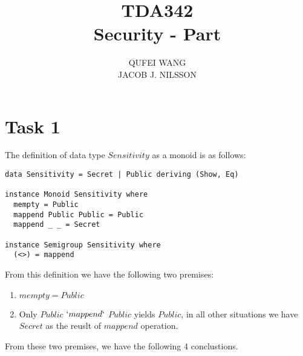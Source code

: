 \documentclass[10pt]{article}
\title{TDA342\\ Security - Part \RomanNumeralCaps 1}
\author{QUFEI WANG \\ JACOB J. NILSSON}
\begin{document}
\maketitle
\section*{Task 1}
The definition of data type $Sensitivity$ as a monoid is as follows:
\begin{lstlisting}
data Sensitivity = Secret | Public deriving (Show, Eq)

instance Monoid Sensitivity where
  mempty = Public
  mappend Public Public = Public
  mappend _ _ = Secret

instance Semigroup Sensitivity where
  (<>) = mappend
\end{lstlisting}
From this definition we have the following two premises:
\begin{enumerate}
\item $mempty = Public$
\item Only $Public$ $`mappend`$ $Public$ yields $Public$, in all other situations we have $Secret$ as the reuslt of $mappend$ operation.
\end{enumerate}
From these two premises, we have the following 4 conclustions.
\end{document}
